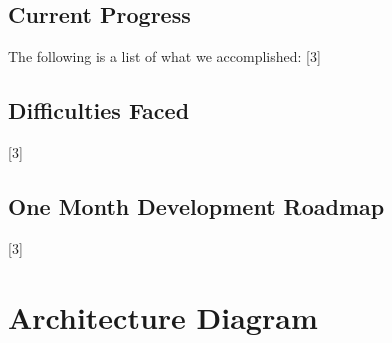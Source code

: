 \documentclass{article}
\begin{document}
\subsection{Current Progress}
The following is a list of what we accomplished:
[3]

\subsection{Difficulties Faced}
[3]

\subsection{One Month Development Roadmap}
[3]

\newpage

\section{Architecture Diagram}
\end{document}
